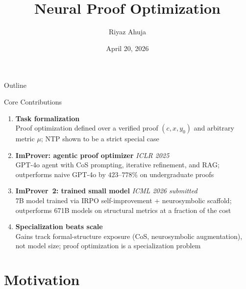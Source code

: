 \documentclass{beamer}
\title{Neural Proof Optimization}
\author{Riyaz Ahuja}
\institute{Department of Mathematics, Carnegie Mellon University}
\date{April 20, 2026}
\begin{document}

\maketitle

\begin{frame}{Outline}
\tableofcontents
\end{frame}

\begin{frame}{Core Contributions}
\vspace{0.3em}
\begin{enumerate}\setlength{\itemsep}{10pt}
  \item[\textbf{C1.}] \textbf{Task formalization}\\
    \small Proof optimization defined over a verified proof $(c,x,y_0)$ and arbitrary metric $\mu$; NTP shown to be a strict special case
  \item[\textbf{C2.}] \textbf{ImProver: agentic proof optimizer} \hfill{\small\textit{ICLR 2025}}\\
    \small GPT-4o agent with CoS prompting, iterative refinement, and RAG; outperforms naive GPT-4o by $423$--$778\%$ on undergraduate proofs
  \item[\textbf{C3.}] \textbf{ImProver~2: trained small model} \hfill{\small\textit{ICML 2026 submitted}}\\
    \small 7B model trained via IRPO self-improvement + neurosymbolic scaffold; outperforms 671B models on structural metrics at a fraction of the cost
  \item[\textbf{C4.}] \textbf{Specialization beats scale}\\
    \small Gains track formal-structure exposure (CoS, neurosymbolic augmentation), not model size; proof optimization is a specialization problem
\end{enumerate}
\end{frame}

\section{Motivation}
\end{document}
